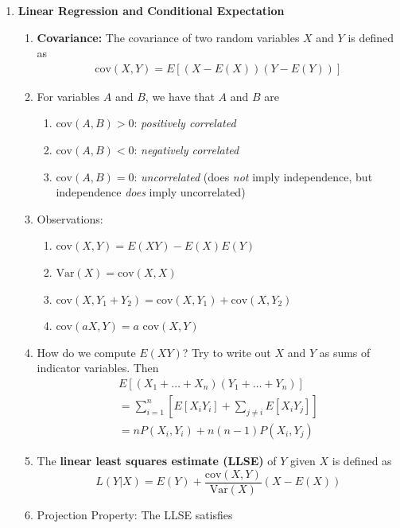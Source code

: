 \documentclass[10pt]{article}
\begin{document}
\begin{multicols}{2}
\begin{enumerate}
        \item \textbf{Linear Regression and Conditional Expectation}
        \begin{enumerate}
            \item \textbf{Covariance:} The covariance of two random variables $X$ and $Y$ is defined as
            \begin{align*}
             \text{cov}(X,Y)=E\left[\left(X-E(X)\right)\left(Y-E(Y)\right)\right]
            \end{align*}
            \item For variables $A$ and $B$, we have that $A$ and $B$ are
            \begin{enumerate}
                \item $\text{cov}(A,B)>0$: \textit{positively correlated}
                \item $\text{cov}(A,B)<0$: \textit{negatively correlated}
                \item $\text{cov}(A,B)=0$: \textit{uncorrelated} (does \textit{not} imply independence, but independence \textit{does} imply uncorrelated)
            \end{enumerate}
            \item Observations:
            \begin{enumerate}
                \item $\text{cov}(X,Y) = E(XY) - E(X)E(Y)$
                \item $\text{Var}(X)=\text{cov}(X,X)$
                \item $\text{cov}(X,Y_1+Y_2) = \text{cov}(X,Y_1)+\text{cov}(X,Y_2)$
                \item $\text{cov}(aX,Y)=a \text{ cov}(X,Y)$
            \end{enumerate}
            \item How do we compute $E(XY)$? Try to write out $X$ and $Y$ as sums of indicator variables. Then \begin{align*}
                E[(X_1+\ldots+X_n)(Y_1+\ldots+Y_n)] \\ =\sum_{i=1}^{n} \left[E[X_iY_i]+\sum_{j \neq i} E[X_iY_j] \right] \\
                = nP(X_i, Y_i) + n(n-1)P(X_i, Y_j)
            \end{align*}
            \item The \textbf{linear least squares estimate (LLSE)} of $Y$ given $X$ is defined as 
            $$L(Y|X)=E(Y)+\frac{\text{cov}(X,Y)}{\text{Var}(X)}(X-E(X))
            $$
            \item Projection Property: The LLSE satisfies

\end{enumerate}
\end{enumerate}
\end{multicols}
\end{document}
